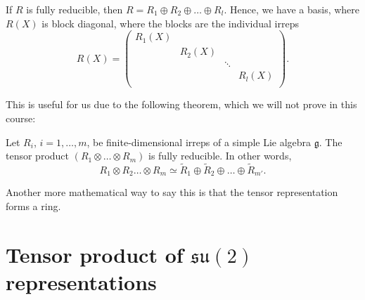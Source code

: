If $R$ is fully reducible, then $R = R_1 \oplus R_2 \oplus \dots \oplus R_l$.
Hence, we have a basis, where $R(X)$ is block diagonal, where the blocks are the individual irreps
\begin{equation}
  R(X) = 
  \begin{pmatrix}
    R_1(X) &  &  &  \\
	   & R_2(X) &  &  \\
    &  & \ddots &  \\
    &  &  & R_l(X) \\
  \end{pmatrix}.
\end{equation}

This is useful for us due to the following theorem, which we will not prove in this course:
\begin{theorem}[]
  Let $R_i$, $i = 1, \dots, m$, be finite-dimensional irreps of a simple Lie algebra $\mathfrak{g}$. The tensor product $(R_1 \otimes \dots \otimes R_m)$ is fully reducible.
  In other words,
  \begin{equation}
    R_1 \otimes R_2 \dots \otimes R_m \simeq \widetilde{R}_1 \oplus \widetilde{R}_2 \oplus \dots \oplus \widetilde{ R}_{m'}.
  \end{equation}
\end{theorem}
\begin{leftbar}
  \begin{remark}
    Another more mathematical way to say this is that the tensor representation forms a ring.
  \end{remark}
\end{leftbar}

\section{Tensor product of \texorpdfstring{$\mathfrak{su}(2)$}{the Lie algebra of SU(2)} representations}%
\label{sec:tensor_product_of_su2_reps}


